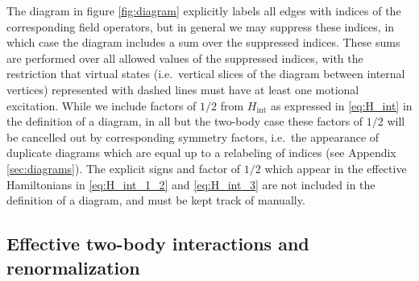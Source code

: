 \documentclass[preprint,showkeys,nofootinbib]{revtex4-1}
\renewcommand{\t}{\text} %
\newcommand{\1}{\mathds{1}}
\begin{document}
The diagram in figure \ref{fig:diagram} explicitly labels all edges
with indices of the corresponding field operators, but in general we
may suppress these indices, in which case the diagram includes a sum
over the suppressed indices.  These sums are performed over all
allowed values of the suppressed indices, with the restriction that
virtual states (i.e.~vertical slices of the diagram between internal
vertices) represented with dashed lines must have at least one
motional excitation.  While we include factors of $1/2$ from
$H_{\t{int}}$ as expressed in \eqref{eq:H_int} in the definition of a
diagram, in all but the two-body case these factors of $1/2$ will be
cancelled out by corresponding symmetry factors, i.e.~the appearance
of duplicate diagrams which are equal up to a relabeling of indices
(see Appendix \ref{sec:diagrams}).  The explicit signs and factor of
$1/2$ which appear in the effective Hamiltonians in
\eqref{eq:H_int_1_2} and \eqref{eq:H_int_3} are not included in the
definition of a diagram, and must be kept track of manually.


\subsection{Effective two-body interactions and renormalization}
\label{sec:two_body}
\end{document}
